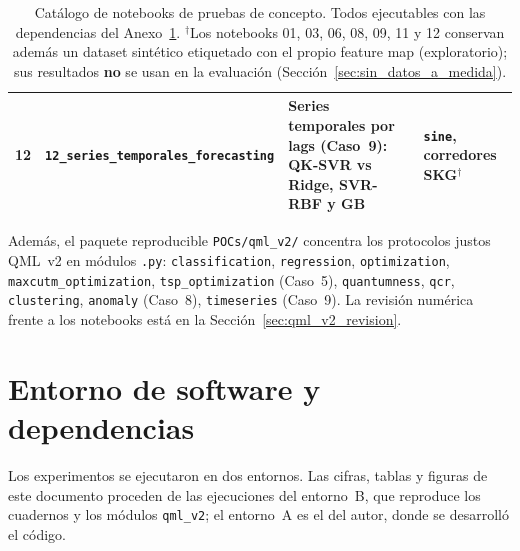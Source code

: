 \begin{table}[ht]
\begin{tabularx}{\linewidth}{@{}c >{\raggedright\arraybackslash}p{4.2cm} >{\raggedright\arraybackslash}X >{\raggedright\arraybackslash}p{3.4cm}@{}}
12 & \nolinkurl{12_series_temporales_forecasting} & Series temporales por lags (Caso~9): QK-SVR vs Ridge, SVR-RBF y GB & \texttt{sine}, corredores SKG$^\dagger$ \\
\bottomrule
\end{tabularx}
\caption{Catálogo de notebooks de pruebas de concepto. Todos ejecutables con las dependencias del Anexo~\ref{anx:entorno}. $^\dagger$Los notebooks 01, 03, 06, 08, 09, 11 y 12 conservan además un dataset sintético etiquetado con el propio feature map (exploratorio); sus resultados \textbf{no} se usan en la evaluación (Sección~\ref{sec:sin_datos_a_medida}).}
\label{tab:notebooks}
\end{table}

Además, el paquete reproducible \texttt{POCs/qml\_v2/} concentra los protocolos justos QML~v2 en módulos \texttt{.py}: \texttt{classification}, \texttt{regression}, \texttt{optimization}, \texttt{maxcutm\_optimization}, \texttt{tsp\_optimization} (Caso~5), \texttt{quantumness}, \texttt{qcr}, \texttt{clustering}, \texttt{anomaly} (Caso~8), \texttt{timeseries} (Caso~9). La revisión numérica frente a los notebooks está en la Sección~\ref{sec:qml_v2_revision}.

\section{Entorno de software y dependencias}
\label{anx:entorno}

Los experimentos se ejecutaron en dos entornos. Las cifras, tablas y figuras de este documento proceden de las ejecuciones del entorno~B, que reproduce los cuadernos y los módulos \texttt{qml\_v2}; el entorno~A es el del autor, donde se desarrolló el código.

